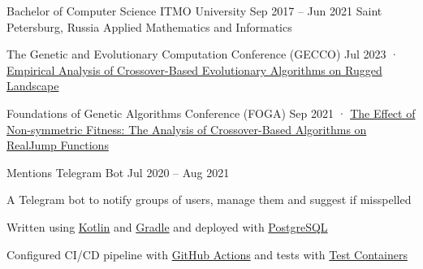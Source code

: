 \documentclass[11pt, a4paper]{style}
\begin{document}
\begin{paracol}{2}
    \cvEntry
        {Bachelor of Computer Science} {ITMO University}
        {Sep 2017 -- Jun 2021} {}
        {Saint Petersburg, Russia}
        {
            \vspace{-1mm}
            Applied Mathematics and Informatics
        }

    \vspace{-1mm}



    \cvEntry
        {The Genetic and Evolutionary Computation Conference (GECCO)} {} {} {} {}
        {
            \vspace{1.5mm}
            Jul 2023 · \href{https://dl.acm.org/doi/10.1145/3583133.3596328}{Empirical Analysis of Crossover-Based Evolutionary Algorithms on Rugged Landscape}
        }

    \cvEntry
        {Foundations of Genetic Algorithms Conference (FOGA)} {} {} {} {}
        {
            \vspace{1.5mm}
            Sep 2021 · \href{https://dl.acm.org/doi/10.1145/3450218.3477311}{The Effect of Non-symmetric Fitness: The Analysis of Crossover-Based Algorithms on RealJump Functions}
        }



    \cvEntry
        {Mentions Telegram Bot} {}
        {Jul 2020 -- Aug 2021} {}
        {}
        {
            \begin{cvItems}
                \item A Telegram bot to notify groups of users, manage them and suggest if misspelled
                \item Written using \underline{Kotlin} and \underline{Gradle} and deployed with \underline{PostgreSQL}
                \item Configured CI/CD pipeline with \underline{GitHub Actions} and tests with \underline{Test Containers}
            \end{cvItems}
            \vspace{-1mm}
             \, 
        }


\switchcolumn



    \vspace{-1mm}



\end{paracol}
\end{document}
